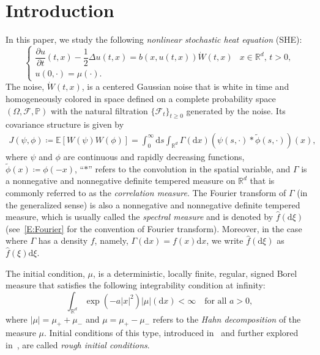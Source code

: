 \documentclass[a4paper,11pt]{article}%
\theoremstyle{plain}
\theoremstyle{definition}
\numberwithin{equation}{section}
\newcommand{\R}{\mathbb{R}}
\newcommand{\E}{\mathbb{E}}
\newcommand{\ud}{\ensuremath{\mathrm{d}}}
\begin{document}
\section{Introduction}
In this paper, we study the following \textit{nonlinear stochastic heat equation} (SHE):
\begin{equation}\label{E:SHE}
    \begin{cases}
     \dfrac{\partial u}{\partial t}(t,x)-\dfrac{1}{2}\Delta u(t,x) = b(x,u(t,x))\dot W(t,x) & \text{$x\in \R^d$, $t>0$}, \\
     u(0,\cdot) = \mu(\cdot).
   \end{cases}
\end{equation}
The noise, $\dot{W}(t,x)$, is a centered Gaussian noise that is white in time and homogeneously
colored in space defined on a complete probability space $(\Omega, \mathcal{F}, \mathbb{P})$ with
the natural filtration $\{\mathcal{F}_t \}_{t\ge 0}$ generated by the noise. Its covariance
structure is given by
\begin{align}\label{E:Cor}
  J(\psi,\phi) \coloneqq \E \left[ W\left(\psi\right) W\left(\phi\right) \right]
  = \int_0^\infty \ud s \int_{\R^d} \Gamma(\ud x)(\psi(s,\cdot)*\widetilde{\phi}(s,\cdot))(x),
\end{align}
where $\psi$ and $\phi$ are continuous and rapidly decreasing functions, $\widetilde{\phi}(x)
\coloneqq \phi(-x)$, ``$*$'' refers to the convolution in the spatial variable, and $\Gamma$ is a
nonnegative and nonnegative definite tempered measure on $\R^d$ that is commonly referred to as the
\textit{correlation measure}. The Fourier transform of $\Gamma$ (in the generalized sense) is also a
nonnegative and nonnegative definite tempered measure, which is usually called the \textit{spectral
measure} and is denoted by $\widehat{f}(\ud \xi)$ (see~\eqref{E:Fourier} for the convention of
Fourier transform). Moreover, in the case where $\Gamma$ has a density $f$, namely, $\Gamma(\ud x) =
f(x) \ud x$, we write $\widehat{f}(\ud \xi)$ as $\widehat{f}(\xi) \ud \xi$.

The initial condition, $\mu$, is a deterministic, locally finite, regular, signed Borel measure that
satisfies the following integrability condition at infinity:
\begin{equation}\label{A:icon}
  \int_{\R^d}\exp\left(-a|x|^2\right) |\mu|(\ud x) < \infty \quad \text{for all $a>0$},
\end{equation}
where $|\mu| = \mu_++\mu_-$ and $\mu = \mu_+-\mu_-$ refers to the \textit{Hahn decomposition} of the
measure $\mu$. Initial conditions of this type, introduced in~\cite{chen.dalang:15:moments*1} and
further explored in~\cite{chen.kim:19:nonlinear,chen.huang:19:comparison}, are called \textit{rough
initial conditions}.
\end{document}
